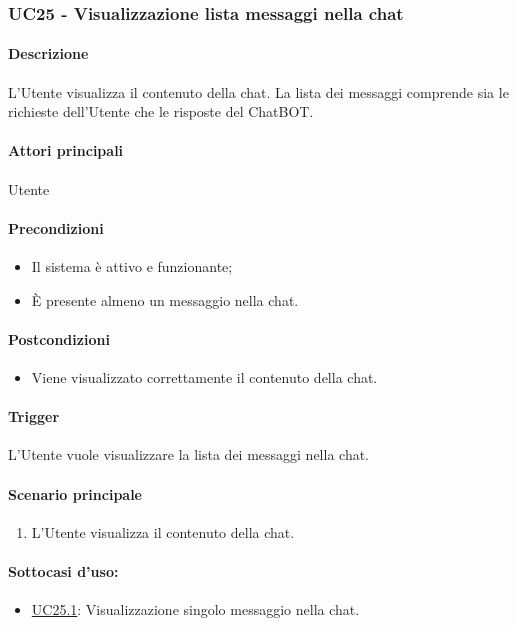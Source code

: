 \subsubsection{UC25 - Visualizzazione lista messaggi nella chat}\label{UC25}
\paragraph*{Descrizione}
L'Utente visualizza il contenuto della chat. La lista dei messaggi comprende sia le richieste dell'Utente che le risposte del ChatBOT.

\paragraph*{Attori principali}
Utente

\paragraph*{Precondizioni}
\begin{itemize}
  \item Il sistema è attivo e funzionante;
  \item È presente almeno un messaggio nella chat.
\end{itemize}

\paragraph*{Postcondizioni}
\begin{itemize}
  \item Viene visualizzato correttamente il contenuto della chat.
\end{itemize}

\paragraph*{Trigger}
L'Utente vuole visualizzare la lista dei messaggi nella chat.

\paragraph*{Scenario principale}
\begin{enumerate}
  \item L'Utente visualizza il contenuto della chat.
\end{enumerate}

\paragraph*{Sottocasi d'uso:}
\begin{itemize}
  \item \hyperref[UC25point1]{UC25.1}: Visualizzazione singolo messaggio nella chat.
\end{itemize}

